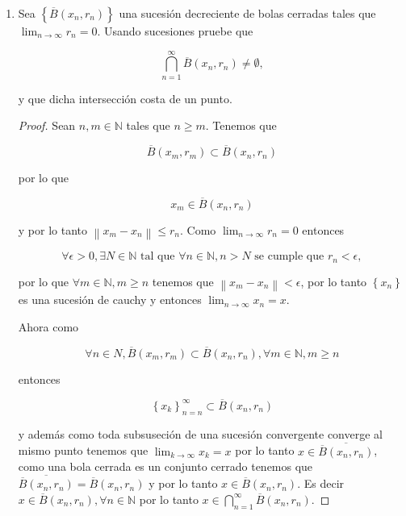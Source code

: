 \documentclass[letterpaper]{article}
\theoremstyle{definition}
\theoremstyle{lemathm}
\theoremstyle{lemathm}
\newtheorem{sol}{Solución}
\theoremstyle{lemathm}
\theoremstyle{lemademthm}
\newcommand{\limtoinf}[1]{\lim_{#1\to\infty}}
\newcommand{\pars}[1]{\left( #1 \right) }
\newcommand{\norm}[1]{\left\lVert#1\right\rVert}
\newcommand{\set}[1]{\left \{ #1 \right\} }
\newcommand{\NN}{\mathbb{N}}
\newcommand{\RR}{\mathbb{R}}
\newcommand{\1}{\mathbbm{1}}
\begin{document}
\begin{enumerate}
\begin{sol}
			por lo tanto $\partial A = \RR$.

			Como $A$ es denso en $R$ entonces $\forall x\in\RR, \epsilon > 0, \pars{B\pars{x,\epsilon}\cap A} \setminus\set{x} \neq 0$ es decir $A' = \RR$, y por lo que no tiene puntos aislados.
			
			Puesto que $A^\circ \cap \partial A = \emptyset$ entonces $A^\circ = \emptyset$. Como $A \cup \partial A = \overline{A}$ entonces $\overline{A} = \RR$. Además como $Ext A = \pars{\overline{A}}^c$ entonces $Ext A = \emptyset$.
		\end{sol}

		\item Sea $\set{\overline{B}\pars{x_n,r_n}}$ una sucesión decreciente de bolas cerradas tales que $\limtoinf{n} r_n = 0$. Usando sucesiones pruebe que
		
		\[\bigcap_{n=1}^{\infty} \overline{B}\pars{x_n,r_n} \neq \emptyset,\]

		y que dicha intersección costa de un punto.

		\begin{proof}
			Sean $n,m\in \NN$ tales que $n \geq m$. Tenemos que 
			
			\[\overline{B}\pars{x_m,r_m}\subset \overline{B}\pars{x_n,r_n}\]
			
			por lo que 
			
			\[x_m \in \overline{B}\pars{x_n,r_n}\]
			
			y por lo tanto $\norm{x_m-x_n}\leq r_n$. Como $\limtoinf{n} r_n = 0$ entonces 
			
			\[\forall \epsilon > 0, \exists N\in\NN \text{ tal que } \forall n\in\NN, n > N \text{ se cumple que } r_n < \epsilon,\]
			
			por lo que $\forall m\in\NN, m \geq n$ tenemos que $\norm{x_m-x_n}<\epsilon$, por lo tanto $\set{x_n}$ es una sucesión de cauchy y entonces $\limtoinf{n} x_n = x$.

			Ahora como 
			
			\[\forall n\in N, \overline{B}\pars{x_m,r_m}\subset \overline{B}\pars{x_n,r_n}, \forall m\in\NN, m\geq n\]
			
			entonces 
			
			\[\set{x_k}_{n=n}^{\infty} \subset \overline{B}\pars{x_n,r_n}\]
			
			y además como toda subsuseción de una sucesión convergente converge al mismo punto tenemos que $\limtoinf{k} x_k = x$ por lo tanto $x \in \overline{\overline{B}\pars{x_n,r_n}}$, como una bola cerrada es un conjunto cerrado tenemos que $\overline{\overline{B}\pars{x_n,r_n}} = \overline{B}\pars{x_n,r_n}$ y por lo tanto $x \in \overline{B}\pars{x_n,r_n}$. Es decir $x \in \overline{B}\pars{x_n,r_n}, \forall n\in\NN$ por lo tanto $x\in \bigcap_{n=1}^{\infty} \overline{B}\pars{x_n,r_n}$.


\end{proof}
\end{enumerate}
\end{document}
